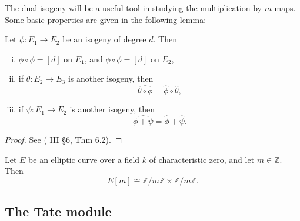 The dual isogeny will be a useful tool in studying the multiplication-by-$m$ maps.
Some basic properties are given in the following lemma:
\begin{lem}
  \label{lem:properties-of-dual-isogenies}
  Let $\phi \colon E_{1} \rightarrow E_{2}$ be an isogeny of degree $d$.  Then
  \begin{enumerate}[(i)]
  \item $\bar{\phi} \circ \phi = \left[ d \right]$ on $E_{1}$, and $\phi \circ
    \bar{\phi} = \left[ d \right]$ on $E_{2}$,
  \item if $\theta \colon E_{2} \rightarrow E_{3}$ is another isogeny, then
    \begin{equation*}
      \widehat{\theta \circ \phi} = \hat{\phi} \circ \hat{\theta},
    \end{equation*}
  \item if $\psi \colon E_{1} \rightarrow E_{2}$ is another isogeny, then
    \begin{equation*}
      \widehat{\phi + \psi} = \hat{\phi} + \hat{\psi}.
    \end{equation*}
  \end{enumerate}
\end{lem}
\begin{proof}
  See (\cite{silverman86} III \S 6, Thm 6.2).
\end{proof}

\begin{prop}
  \label{prop:structure-of-E[m]}
  Let $E$ be an elliptic curve over a field $k$ of characteristic zero, and let $m
  \in \mathbb{Z}$.  Then
  \begin{equation*}
    E[m] \cong \mathbb{Z} / m \mathbb{Z} \times \mathbb{Z} / m \mathbb{Z}.
  \end{equation*}
\end{prop}

\subsection{The Tate module}
\label{sec:tate-module}

